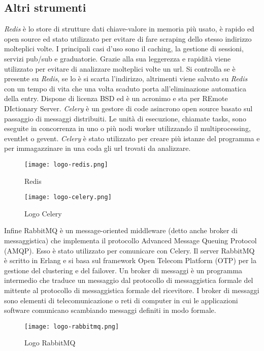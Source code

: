 \subsection{Altri strumenti}

\textit{Redis} è lo store di strutture dati chiave-valore in memoria più usato, è rapido ed open source ed stato utilizzato per evitare di fare scraping dello stesso indirizzo molteplici volte. I principali casi d'uso sono il caching, la gestione di sessioni, servizi pub/sub e graduatorie. Grazie alla sua leggerezza e rapidità viene utilizzato per evitare di analizzare molteplici volte un url. Si controlla se è presente su \textit{Redis}, se lo è si scarta l'indirizzo, altrimenti viene salvato su \textit{Redis} con un tempo di vita che una volta scaduto porta all'eliminazione automatica della entry. Dispone di licenza BSD ed è un acronimo e sta per REmote DIctionary Server.
\textit{Celery} è un gestore di code asincrono open source basato sul passaggio di messaggi distribuiti. Le unità di esecuzione, chiamate tasks, sono eseguite in concorrenza in uno o più nodi worker utilizzando il multiprocessing, eventlet o gevent. \textit{Celery} è stato utilizzato per creare più istanze del programma e per immagazzinare in una coda gli url trovati da analizzare.\newline{}
\begin{figure}[!h]
    \begin{minipage}{.5\textwidth} 
        \centering 
        \texttt{[image: logo-redis.png]} 
        \caption{Redis} 
        \label{fig:redis} 
    \end{minipage}%
    \begin{minipage}{.5\textwidth} 
        \centering 
        \texttt{[image: logo-celery.png]} 
        \caption{Logo Celery} 
        \label{fig:celery} 
    \end{minipage}%
\end{figure}

Infine RabbitMQ è un message-oriented middleware (detto anche broker di messaggistica) che implementa il protocollo Advanced Message Queuing Protocol (AMQP). Esso è stato utilizzato per comunicare con Celery. Il server RabbitMQ è scritto in Erlang e si basa sul framework Open Telecom Platform (OTP) per la gestione del clustering e del failover. Un broker di messaggi è un programma intermedio che traduce un messaggio dal protocollo di messaggistica formale del mittente al protocollo di messaggistica formale del ricevitore. I broker di messaggi sono elementi di telecomunicazione o reti di computer in cui le applicazioni software comunicano scambiando messaggi definiti in modo formale. 
\begin{figure}[!h] 
    \centering 
    \texttt{[image: logo-rabbitmq.png]} 
    \caption{Logo RabbitMQ}
    \label{fig:rabbitmq} 
\end{figure}

